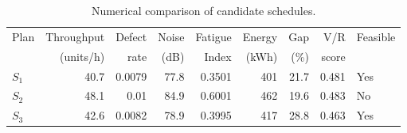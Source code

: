\begin{table}[htbp]
\centering
\caption{Numerical comparison of candidate schedules.}
\label{tab:numerical-sim}
\small
\begin{tabular}{@{}lrrrrrrrl@{}}
\toprule
Plan & Throughput & Defect & Noise & Fatigue & Energy & Gap & V/R & Feasible \\
     & (units/h)  & rate   & (dB)  & Index   & (kWh)  & (\%) & score &         \\
\midrule
$S_{1}$ & 40.7 & 0.0079 & 77.8 & 0.3501 & 401 & 21.7 & 0.481 & Yes \\
$S_{2}$ & 48.1 & 0.01 & 84.9 & 0.6001 & 462 & 19.6 & 0.483 & No \\
$S_{3}$ & 42.6 & 0.0082 & 78.9 & 0.3995 & 417 & 28.8 & 0.463 & Yes \\
\bottomrule
\end{tabular}
\end{table}
